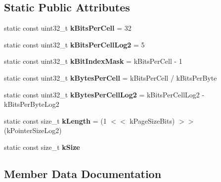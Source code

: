 \subsection*{Static Public Attributes}
\begin{DoxyCompactItemize}
\item 
static const uint32\+\_\+t {\bfseries k\+Bits\+Per\+Cell} = 32\hypertarget{classv8_1_1internal_1_1_bitmap_ae863e06b48d36390b61adb7a17cf3b8a}{}\label{classv8_1_1internal_1_1_bitmap_ae863e06b48d36390b61adb7a17cf3b8a}

\item 
static const uint32\+\_\+t {\bfseries k\+Bits\+Per\+Cell\+Log2} = 5\hypertarget{classv8_1_1internal_1_1_bitmap_ac36de25dc5fe77ac7d032806046f8b7a}{}\label{classv8_1_1internal_1_1_bitmap_ac36de25dc5fe77ac7d032806046f8b7a}

\item 
static const uint32\+\_\+t {\bfseries k\+Bit\+Index\+Mask} = k\+Bits\+Per\+Cell -\/ 1\hypertarget{classv8_1_1internal_1_1_bitmap_ab1aa75c88deb4ec9719b36f43b72ddff}{}\label{classv8_1_1internal_1_1_bitmap_ab1aa75c88deb4ec9719b36f43b72ddff}

\item 
static const uint32\+\_\+t {\bfseries k\+Bytes\+Per\+Cell} = k\+Bits\+Per\+Cell / k\+Bits\+Per\+Byte\hypertarget{classv8_1_1internal_1_1_bitmap_a080e9299f086ebfb682fbc658845faf9}{}\label{classv8_1_1internal_1_1_bitmap_a080e9299f086ebfb682fbc658845faf9}

\item 
static const uint32\+\_\+t {\bfseries k\+Bytes\+Per\+Cell\+Log2} = k\+Bits\+Per\+Cell\+Log2 -\/ k\+Bits\+Per\+Byte\+Log2\hypertarget{classv8_1_1internal_1_1_bitmap_a3c76e7d38fe4a2c25b7f973ebdd9ae64}{}\label{classv8_1_1internal_1_1_bitmap_a3c76e7d38fe4a2c25b7f973ebdd9ae64}

\item 
static const size\+\_\+t {\bfseries k\+Length} = (1 $<$$<$ k\+Page\+Size\+Bits) $>$$>$ (k\+Pointer\+Size\+Log2)\hypertarget{classv8_1_1internal_1_1_bitmap_a7767d3d50dcd1efdc3c5427dcb62168e}{}\label{classv8_1_1internal_1_1_bitmap_a7767d3d50dcd1efdc3c5427dcb62168e}

\item 
static const size\+\_\+t {\bfseries k\+Size}
\end{DoxyCompactItemize}


\subsection{Member Data Documentation}
